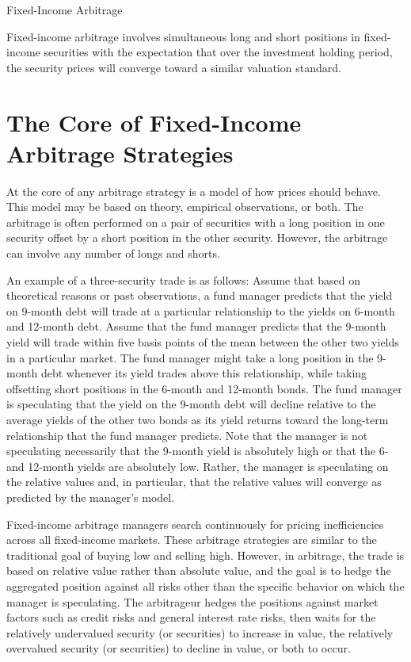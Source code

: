 \documentclass[11pt]{article}
\begin{document}
Fixed-Income Arbitrage

Fixed-income arbitrage involves simultaneous long and short positions in fixed-income securities with the expectation that over the investment holding period, the security prices will converge toward a similar valuation standard.

\section*{The Core of Fixed-Income Arbitrage Strategies}
At the core of any arbitrage strategy is a model of how prices should behave. This model may be based on theory, empirical observations, or both. The arbitrage is often performed on a pair of securities with a long position in one security offset by a short position in the other security. However, the arbitrage can involve any number of longs and shorts.

An example of a three-security trade is as follows: Assume that based on theoretical reasons or past observations, a fund manager predicts that the yield on 9-month debt will trade at a particular relationship to the yields on 6-month and 12-month debt. Assume that the fund manager predicts that the 9-month yield will trade within five basis points of the mean between the other two yields in a particular market. The fund manager might take a long position in the 9-month debt whenever its yield trades above this relationship, while taking offsetting short positions in the 6-month and 12-month bonds. The fund manager is speculating that the yield on the 9-month debt will decline relative to the average yields of the other two bonds as its yield returns toward the long-term relationship that the fund manager predicts. Note that the manager is not speculating necessarily that the 9-month yield is absolutely high or that the 6-and 12-month yields are absolutely low. Rather, the manager is speculating on the relative values and, in particular, that the relative values will converge as predicted by the manager's model.

Fixed-income arbitrage managers search continuously for pricing inefficiencies across all fixed-income markets. These arbitrage strategies are similar to the traditional goal of buying low and selling high. However, in arbitrage, the trade is based on relative value rather than absolute value, and the goal is to hedge the aggregated position against all risks other than the specific behavior on which the manager is speculating. The arbitrageur hedges the positions against market factors such as credit risks and general interest rate risks, then waits for the relatively undervalued security (or securities) to increase in value, the relatively overvalued security (or securities) to decline in value, or both to occur.
\end{document}
